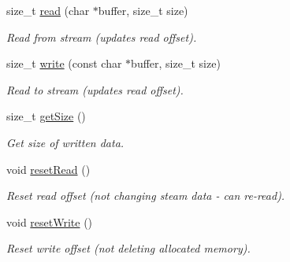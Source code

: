 \begin{DoxyCompactItemize}
size\+\_\+t \hyperlink{classglow_1_1_block_stream_a6d35d45098e2794047d318602028ce77}{read} (char $\ast$buffer, size\+\_\+t size)
\begin{DoxyCompactList}\small\item\em Read from stream (updates read offset). \end{DoxyCompactList}\item 
\mbox{\label{classglow_1_1_block_stream_a162b46f672d78e4d68d119c135017252}} 
size\+\_\+t \hyperlink{classglow_1_1_block_stream_a162b46f672d78e4d68d119c135017252}{write} (const char $\ast$buffer, size\+\_\+t size)
\begin{DoxyCompactList}\small\item\em Read to stream (updates read offset). \end{DoxyCompactList}\item 
\mbox{\label{classglow_1_1_block_stream_afec81b725887152686c3da25afd7b343}} 
size\+\_\+t \hyperlink{classglow_1_1_block_stream_afec81b725887152686c3da25afd7b343}{get\+Size} ()
\begin{DoxyCompactList}\small\item\em Get size of written data. \end{DoxyCompactList}\item 
\mbox{\label{classglow_1_1_block_stream_a81872800d6b2c64165e271b49086b119}} 
void \hyperlink{classglow_1_1_block_stream_a81872800d6b2c64165e271b49086b119}{reset\+Read} ()
\begin{DoxyCompactList}\small\item\em Reset read offset (not changing steam data -\/ can re-\/read). \end{DoxyCompactList}\item 
\mbox{\label{classglow_1_1_block_stream_abbd4031369501396d012fa25019fe730}} 
void \hyperlink{classglow_1_1_block_stream_abbd4031369501396d012fa25019fe730}{reset\+Write} ()
\begin{DoxyCompactList}\small\item\em Reset write offset (not deleting allocated memory). \end{DoxyCompactList}\item 
\mbox{\label{classglow_1_1_block_stream_a2e7d260c31548fec456369ada8772f96}} 

\end{DoxyCompactItemize}
